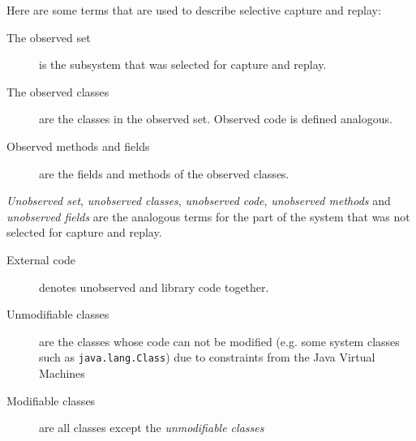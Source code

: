 Here are some terms that are used to describe selective capture and replay:
\begin{description}
	\item [The observed set] is the subsystem that was selected for capture and replay.
	\item [The observed classes] are the classes in the observed set. Observed code is defined analogous.
	\item [Observed methods and fields] are the fields and methods of the observed classes.
\end{description}
\emph{Unobserved set},  \emph{unobserved classes}, \emph{unobserved code}, \emph{unobserved methods} and \emph{unobserved fields} are the analogous terms for the part of the system that was not selected for capture and replay.
\begin{description}
	\item [External code] denotes unobserved and library code together.
	\item [Unmodifiable classes] are the classes whose code can not be modified (e.g. some system classes such as \texttt{java.lang.Class}) due to constraints from the Java Virtual Machines
	\item [Modifiable classes] are all classes except the \emph{unmodifiable classes}
\end{description}

